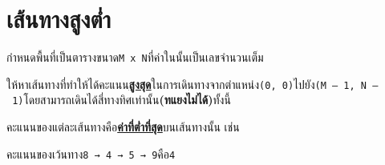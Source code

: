 \documentclass{article}
\begin{document}
\section*{เส้นทางสูงต่ำ}

กำหนดพื้นที่เป็นตารางขนาด\texttt{M\ x\ N}ที่ค่าในนั้นเป็นเลขจำนวนเต็ม

ให้หาเส้นทางที่ทำให้ได้คะแนน\ul{\textbf{สูงสุด}}ในการเดินทางจากตำแหน่ง\texttt{(0,\ 0)}ไปยัง\texttt{(M\ –\ 1,\ N\ –\ 1)}โดยสามารถเดินได้สี่ทางทิศเท่านั้น\textbf{(ทแยงไม่ได้)}ทั้งนี้

คะแนนของแต่ละเส้นทางคือ\ul{\textbf{ค่าที่ต่ำที่สุด}}บนเส้นทางนั้น เช่น

คะแนนของเว้นทาง\texttt{8\ →\ 4\ →\ 5\ →\ 9}คือ\texttt{4}\\



\hfill\break
\end{document}
